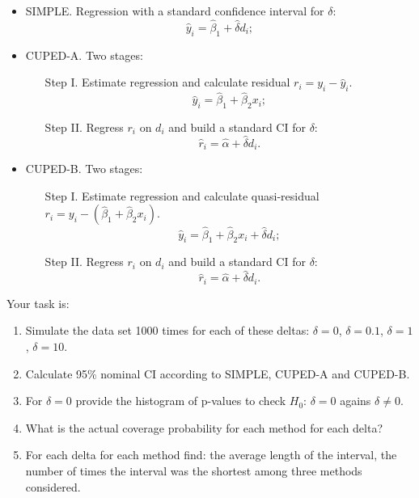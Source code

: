 \documentclass[12pt]{article}
\newcommand{\1}{\mathbbm{I}}
\begin{document}
\begin{enumerate}
\begin{itemize}
	\item SIMPLE. Regression with a standard confidence interval for $\delta$:
	\[
		\hat y_i = \hat \beta_1 + \hat \delta d_i;
	\]
	\item CUPED-A. Two stages:
	\begin{enumerate}
		\item[Step I.] Estimate regression and calculate residual $r_i = y_i - \hat y_i$.
		\[
			\hat y_i = \hat \beta_1 + \hat \beta_2 x_i;
		\]
		\item[Step II.] Regress $r_i$ on $d_i$ and build a standard CI for $\delta$:
		\[
		\hat r_i = \hat \alpha + \hat \delta d_i.	
		\]
	\end{enumerate}
	\item CUPED-B. Two stages:
	\begin{enumerate}
		\item[Step I.] Estimate regression and calculate quasi-residual $r_i = y_i - (\hat\beta_1 + \hat\beta_2 x_i)$.
		\[
			\hat y_i = \hat \beta_1 + \hat \beta_2 x_i + \hat \delta d_i;
		\]
		\item[Step II.] Regress $r_i$ on $d_i$ and build a standard CI for $\delta$:
		\[
		\hat r_i = \hat \alpha + \hat \delta d_i.	
		\]
	\end{enumerate}
\end{itemize}

Your task is:
\begin{enumerate}
	\item Simulate the data set 1000 times for each of these deltas: $\delta = 0$, $\delta = 0.1$, $\delta = 1$, $\delta = 10$.
	\item Calculate 95\% nominal CI according to SIMPLE, CUPED-A and CUPED-B.
	\item For $\delta =0$ provide the histogram of p-values to check $H_0$: $\delta = 0$ agains $\delta \neq 0$. 
	\item What is the actual coverage probability for each method for each delta?
	\item For each delta for each method find: the average length of the interval, 
	the number of times the interval was the shortest among three methods considered. 
\end{enumerate}


\end{enumerate}
\end{document}
